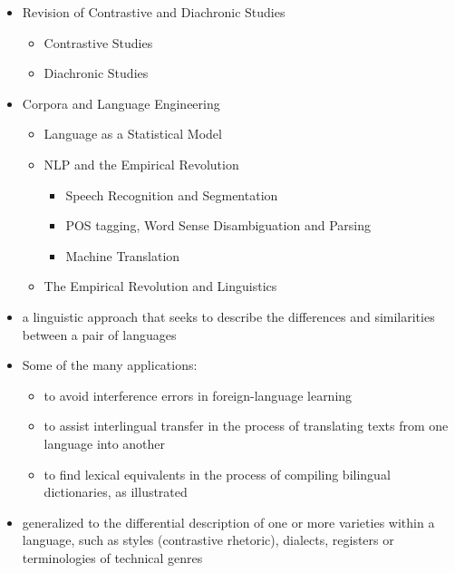 \documentclass[a4paper,landscape,headrule,footrule,dvips]{foils}
\begin{document}
\begin{CJK}{UTF8}{min}

\maketitle



\begin{itemize} 
\item Revision of Contrastive and Diachronic Studies
  \begin{itemize} 
  \item Contrastive Studies
  \item Diachronic Studies
  \end{itemize}
\item Corpora and Language Engineering
  \begin{itemize}
  \item Language as a Statistical Model
  \item NLP and the Empirical Revolution
    \begin{itemize}
    \item Speech Recognition and Segmentation
    \item POS tagging, Word Sense Disambiguation and Parsing
    \item Machine Translation
    \end{itemize}
  \item The Empirical Revolution and Linguistics
  \end{itemize}
\end{itemize}




\begin{itemize}
\item  a linguistic approach that seeks to describe the differences and similarities between a pair of languages
\item Some of the many applications:
  \begin{itemize}
  \item to avoid interference errors in foreign-language learning
  \item to assist interlingual transfer in the process of translating texts from one language into another
  \item to find lexical equivalents in the process of compiling bilingual dictionaries, as illustrated
  \end{itemize}
\item generalized to the differential description of one or more varieties within a language, such as styles (contrastive rhetoric), dialects, registers or terminologies of technical genres
\end{itemize}



\end{CJK}
\end{document}
